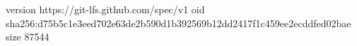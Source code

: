 version https://git-lfs.github.com/spec/v1
oid sha256:d75b5c1e3eed702e63de2b590d1b392569b12dd2417f1c459ee2ecddfed02bae
size 87544
